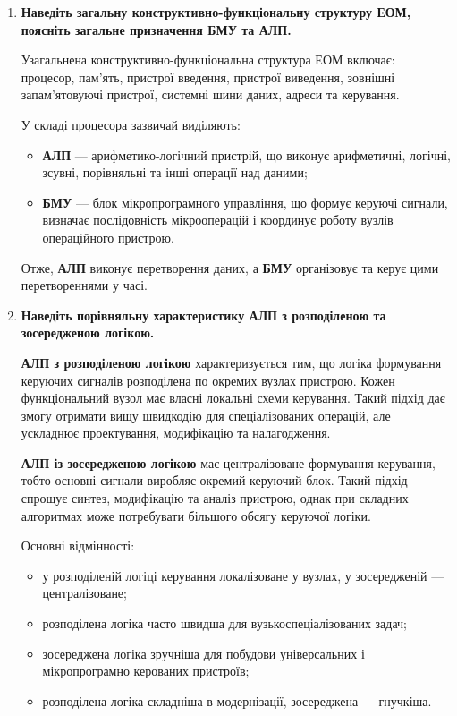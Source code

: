 \documentclass[12pt,a4paper]{article}
\begin{document}
    \begin{enumerate}
        \item \textbf{Наведіть загальну конструктивно-функціональну структуру ЕОМ, поясніть загальне призначення БМУ та АЛП.}

        Узагальнена конструктивно-функціональна структура ЕОМ включає:
        процесор, пам'ять, пристрої введення, пристрої виведення, зовнішні запам'ятовуючі пристрої, системні шини даних, адреси та керування.

        У складі процесора зазвичай виділяють:
        \begin{itemize}
            \item \textbf{АЛП} --- арифметико-логічний пристрій, що виконує арифметичні, логічні, зсувні, порівняльні та інші операції над даними;
            \item \textbf{БМУ} --- блок мікропрограмного управління, що формує керуючі сигнали, визначає послідовність мікрооперацій і координує роботу вузлів операційного пристрою.
        \end{itemize}

        Отже, \textbf{АЛП} виконує перетворення даних, а \textbf{БМУ} організовує та керує цими перетвореннями у часі.

        \item \textbf{Наведіть порівняльну характеристику АЛП з розподіленою та зосередженою логікою.}

        \textbf{АЛП з розподіленою логікою} характеризується тим, що логіка формування керуючих сигналів розподілена по окремих вузлах пристрою. Кожен функціональний вузол має власні локальні схеми керування. Такий підхід дає змогу отримати вищу швидкодію для спеціалізованих операцій, але ускладнює проектування, модифікацію та налагодження.

        \textbf{АЛП із зосередженою логікою} має централізоване формування керування, тобто основні сигнали виробляє окремий керуючий блок. Такий підхід спрощує синтез, модифікацію та аналіз пристрою, однак при складних алгоритмах може потребувати більшого обсягу керуючої логіки.

        Основні відмінності:
        \begin{itemize}
            \item у розподіленій логіці керування локалізоване у вузлах, у зосередженій --- централізоване;
            \item розподілена логіка часто швидша для вузькоспеціалізованих задач;
            \item зосереджена логіка зручніша для побудови універсальних і мікропрограмно керованих пристроїв;
            \item розподілена логіка складніша в модернізації, зосереджена --- гнучкіша.
        \end{itemize}


\end{enumerate}
\end{document}
